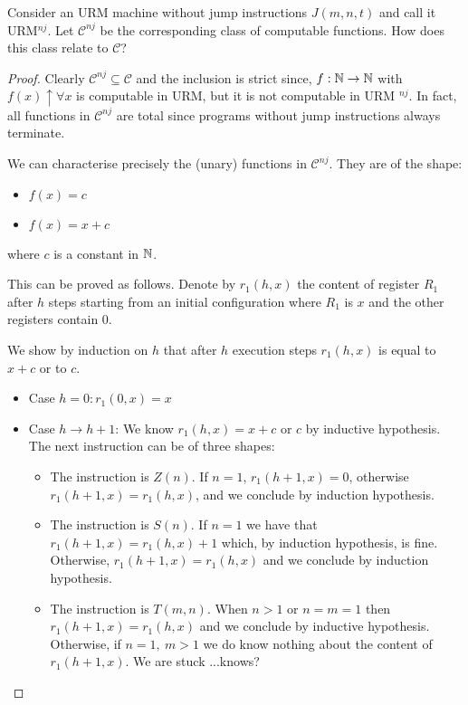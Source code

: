 \begin{exercise}
Consider an URM machine without jump instructions  $J(m,n,t)$ and call it URM$ ^{nj}$. Let $\mathcal{C}^{nj}$ be the corresponding class of computable functions. How does this class relate to $\mathcal{C}$?


\begin{proof}

  Clearly $\mathcal{C}^{nj} \subseteq \mathcal{C}$ and the inclusion is strict since,  $f: \mathbb{N} \rightarrow \mathbb{N}$ with $f(x)\uparrow \forall x$ is computable in URM, but it is not computable in URM $ ^{nj} $.  In fact, all functions in $\mathcal{C}^{nj}$  are total since programs without jump instructions always terminate.

  We can characterise precisely the (unary) functions in $\mathcal{C}^{nj}$. They are of the shape:
\begin{itemize}
  \item $f(x) = c$
  \item $ f(x) = x + c$
\end{itemize}
where $c$ is a constant in $\mathbb{N}$.

This can be proved as follows. Denote by $r_1(h,x) $ the content of register $R_1$ after $h$ steps starting from an initial configuration where $R_1$ is $x$ and the other registers contain $0$.

We show by induction on $h$ that after $h$ execution steps $r_1(h,x) $ is equal to $x + c$ or to $c$.

\begin{itemize}
  \item Case $h = 0: r_1(0,x) = x $

  \item Case $h \rightarrow h+1$: We know $ r_1(h,x) = x+c $ or $ c $ by inductive hypothesis. The next instruction can be of three shapes:
  \begin{itemize}
  \item The instruction is $Z (n)$. If $n = 1$, $r_1(h+1,x) = 0 $, otherwise $r_1(h+1,x) = r_1(h,x)$, and we conclude by induction hypothesis.
    
  \item The instruction is $S (n)$. If $n = 1$ we have that $r_1(h+1,x) = r_1(h,x)+1 $ which, by induction hypothesis, is fine. Otherwise,  $r_1(h+1,x) = r_1(h,x)$ and we conclude by induction hypothesis.
    
  \item The instruction is $T (m, n)$. When $n>1 $ or $n=m=1$ then $r_1(h+1,x) = r_1(h,x)$ and we conclude by inductive hypothesis. Otherwise, if $n = 1,\ m > 1$ we do know nothing about the content of $r_1(h+1,x) $. We are stuck ...knows?
  \end{itemize}


\end{itemize}
\end{proof}
\end{exercise}
